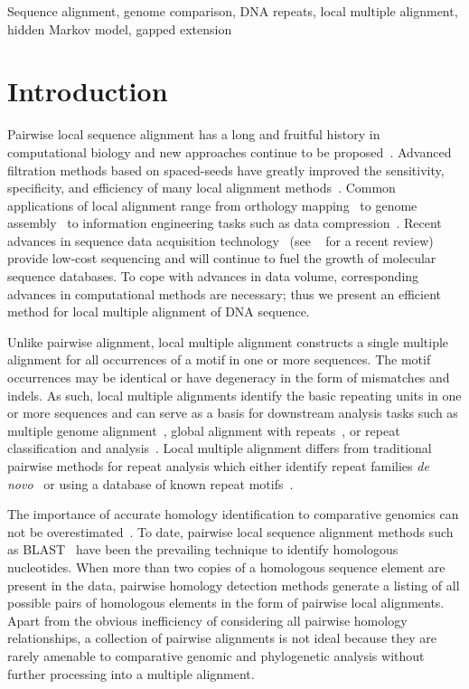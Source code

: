 \documentclass[12pt,journal,draftcls,letterpaper,onecolumn]{IEEEtran}
\begin{document}
\begin{IEEEkeywords}
Sequence alignment, genome comparison, DNA repeats, local multiple alignment, hidden Markov model, gapped extension
\end{IEEEkeywords}

\IEEEpeerreviewmaketitle
\section{Introduction}
Pairwise local sequence alignment has a long and fruitful history in computational biology and new approaches continue to be proposed~\cite{ref-pattern,ref-chaos,ref-yass,ref-kahveciMAP}. Advanced filtration methods based on spaced-seeds have greatly improved the sensitivity, specificity, and efficiency of many local alignment methods~\cite{ref-zhang04,ref-zhang06,ref-buhler05,ref-xu04,ref-batzoglouNAR, ref-rasmussen}. Common applications of local alignment range from orthology mapping~\cite{ref-orthomcl} to genome assembly~\cite{ref-arachne2} to information engineering tasks such as data compression~\cite{ref-ane}. Recent advances in sequence data acquisition technology~\cite{ref-454, sequencing, hybrid} (see ~\cite{ref-nextgenseq} for a recent review) provide low-cost sequencing and will continue to fuel the growth of molecular sequence databases. To cope with advances in data volume, corresponding advances in computational methods are necessary; thus we present an efficient method for local multiple alignment of DNA sequence.

Unlike pairwise alignment, local multiple alignment constructs a single multiple alignment for all occurrences of a motif in one or more sequences.  The motif occurrences may be identical or have degeneracy in the form of mismatches and indels.  As such, local multiple alignments identify the basic repeating units in one or
more sequences and can serve as a basis for downstream analysis tasks such as multiple genome alignment~\cite{ref-mauve,ref-mga,ref-mgcat,ref-deweyReview}, global alignment with repeats~\cite{ref-otherSammethPaper,ref-aba}, or repeat classification and analysis~\cite{ref-piler}.  Local multiple alignment differs from traditional pairwise methods for repeat analysis which either identify repeat families \textit{de novo}~\cite{ref-reputer} or using a database of known repeat motifs~\cite{ref-repbase}.

The importance of accurate homology identification to comparative genomics can not be overestimated~\cite{Kumar07}. To date, pairwise local sequence alignment methods such as BLAST~\cite{ref-blastz,ref-ssearch} have been the prevailing technique to identify homologous nucleotides. When more than two copies of a homologous sequence element are present in the data, pairwise homology detection methods generate a listing of all possible pairs of homologous elements in the form of pairwise local alignments.  Apart from the obvious inefficiency of considering all pairwise homology relationships, a collection of pairwise alignments is not ideal because they are rarely amenable to comparative genomic and phylogenetic analysis without further processing into a multiple alignment.
\end{document}
